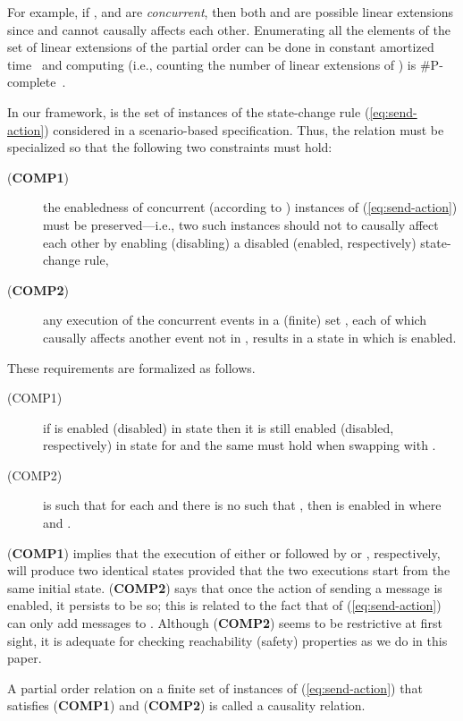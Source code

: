 \documentclass[conference]{llncs}
\begin{document}
{For example, if ,  and 
are \emph{concurrent}, then both  and  are possible linear extensions since  and  cannot
causally affects each other. Enumerating all the elements of the set
 of linear extensions of the partial order  can
be done in  constant amortized
time~\cite{pruesse-ruskey} and computing  (i.e., counting
the number of linear extensions of ) is
\#P-complete~\cite{brightwell-winkler}.  

In our framework,  is the set of instances
of the state-change rule (\ref{eq:send-action}) considered in a
scenario-based specification. 
Thus, the relation  must be specialized so that
the following two constraints must hold: 
\begin{description}
\item[(\textbf{COMP1})] the
enabledness of concurrent (according to ) instances of
(\ref{eq:send-action}) must be preserved---i.e., two such instances
should not to causally affect each other by enabling (disabling) a
disabled (enabled, respectively) state-change rule,
\item[(\textbf{COMP2})] any execution of the concurrent events in a (finite)
set , each of which causally affects another event  not in ,
results in a state in which  is enabled.
\end{description}
 
These requirements are
formalized as follows.
\begin{description}
\item[(COMP1)] if  is enabled (disabled) in state  then it is
  still enabled (disabled, respectively) in state  for
   and the same must hold when swapping 
  with .
\item[(COMP2)]  is such that  for
  each  
and there is no  such that
  , then  is enabled in  where
   and .
\end{description}
(\textbf{COMP1}) implies that the execution of either  or 
followed by  or , respectively, will produce two identical
states provided that the two executions start from the same initial
state.  
(\textbf{COMP2}) says that once the action of sending a
message is enabled, it persists to be so; this is related to the fact
that of (\ref{eq:send-action}) can only add messages to .
Although (\textbf{COMP2}) seems to be restrictive at first sight, it
is adequate for checking reachability (safety) properties as we do in
this paper.


\begin{definition}
A partial order relation  on a finite set  of instances
of (\ref{eq:send-action}) that satisfies (\textbf{COMP1}) and
(\textbf{COMP2}) is called a causality relation.  
\end{definition}

}
\end{document}
